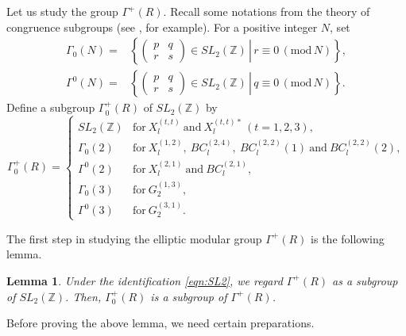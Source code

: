 \documentclass[11pt]{amsart}
\newcommand{\Z}{\mathbb{Z}}
\newtheorem{lemma}[thm]{Lemma}%
\begin{document}
{{
Let us study the group $\Gamma^+(R)$. 
Recall some notations from the theory of congruence subgroups 
(see \cite{Koblitz1993}, for example). For
a positive integer $N$, set
\begin{align*}
\Gamma_0(N)=
&\left\{\left.\begin{pmatrix} p & q\\ r & s\end{pmatrix}
\in SL_2(\Z)\,\right|\,
r\equiv 0\, (\mathrm{mod}\, N)
\right\},\\
\Gamma^0(N)=
&\left\{\left.\begin{pmatrix} p & q\\ r & s\end{pmatrix}
\in SL_2(\Z)\,\right|\,
q\equiv 0\, (\mathrm{mod}\, N)
\right\}.
\end{align*}
Define a subgroup $\Gamma_0^+(R)$ of $SL_2(\Z)$ by
\[\Gamma_0^+(R)=\begin{cases}
SL_2(\Z) & \text{for}\ X_l^{(t,t)}\ \text{and}\ X_l^{(t,t)\ast} \, (t=1,2,3),\\
\Gamma_0(2) & \text{for}\ X_l^{(1,2)},\ BC_l^{(2,4)},\ 
BC_l^{(2,2)}(1)\ \text{and}\ BC_l^{(2,2)}(2),\\
\Gamma^0(2)& \text{for}\ X_l^{(2,1)}\ \text{and}\ BC_l^{(2,1)},\\
\Gamma_0(3)& \text{for}\ G_2^{(1,3)},\\
\Gamma^0(3)& \text{for}\ G_2^{(3,1)}.
\end{cases}\]

The first step in studying the elliptic modular group $\Gamma^+(R)$
is the following lemma.

\begin{lemma}\label{lemma:Gamma0+}
Under the identification \eqref{eqn:SL2}, we regard $\Gamma^+(R)$ as 
a subgroup of $SL_2(\Z)$. Then, $\Gamma_0^+(R)$ is a subgroup of 
$\Gamma^+(R)$. 
\end{lemma}

Before proving the above lemma, we need certain preparations.

}}
\end{document}
